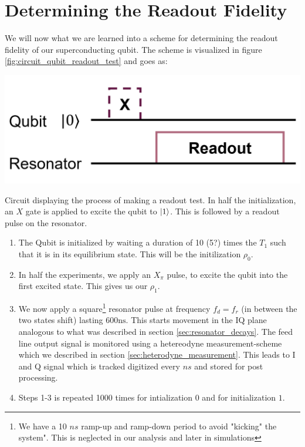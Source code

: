 \section{Determining the Readout Fidelity}
We will now what we are learned into a scheme for determining the readout fidelity of our superconducting qubit. The scheme is visualized in figure \ref{fig:circuit_qubit_readout_test} and goes as:
\begin{marginfigure}
    \centering
    \includegraphics[]{Figs/circuits/readout_test.png}
    \caption{Circuit displaying the process of making a readout test. In half the initialization, an $X$ gate is applied to excite the qubit to $\ket{1}$. This is followed by a readout pulse on the resonator.}
    \label{fig:circuit_qubit_readout_test}
\end{marginfigure}
\begin{enumerate}
    \item The Qubit is initialized by waiting a duration of 10 (5?) times the $T_1$ such that it is in its equilibrium state. This will be the initilization $\rho_0$.
    \item In half the experiments, we apply an $X_\pi$ pulse, to excite the qubit into the first excited state. This gives us our $\rho_1$.
    \item We now apply a square\footnote{We have a 10 $ns$ ramp-up and ramp-down period to avoid "kicking" the system". This is neglected in our analysis and later in simulations} resonator pulse at frequency $f_d = f_r$ (in between the two states shift) lasting $600 \text{ns}$. This starts movement in the IQ plane  analogous to what was described in section \ref{sec:resonator_decays}. The feed line output signal is monitored using a hetereodyne measurement-scheme which we described in section \ref{sec:heterodyne_measurement}. This leads to I and Q signal which is tracked digitized every $ns$ and stored for post processing.
    \item Steps 1-3 is repeated 1000 times for intialization $0$ and for initialization $1$.
\end{enumerate}
